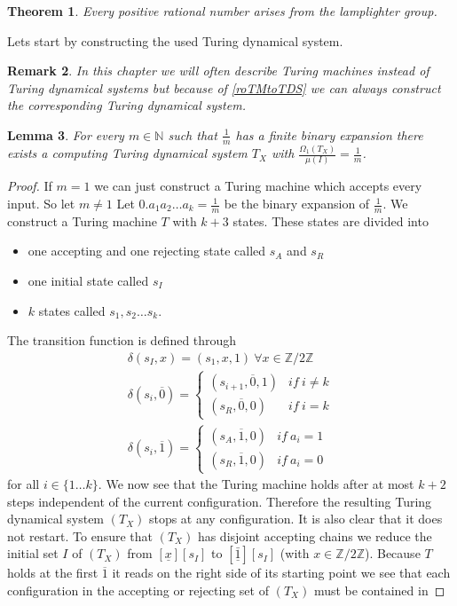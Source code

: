 \documentclass[12pt,a4paper]{scrartcl}
\newtheorem{Theorem}{Theorem}[section]
\newtheorem{Lemma}[Theorem]{Lemma}
\newtheorem{Remark}[Theorem]{Remark}
\numberwithin{equation}{section}
\newcommand{\N}{\mathbb{N}} %
\newcommand{\2}{\mathbb{Z} / 2 \mathbb{Z}}
\newcommand{\1}{\bar{1}}
\newcommand{\0}{\bar{0}}
\begin{document}
\begin{Theorem} \label{mainTh}
	Every positive rational number arises from the lamplighter group.
\end{Theorem}
Lets start by constructing the used Turing dynamical system. 
\begin{Remark}
	In this chapter we will often describe Turing machines instead of Turing dynamical systems but because of \ref{roTMtoTDS} we can always construct the corresponding Turing dynamical system.
\end{Remark}
\begin{Lemma} \label{1TM}
	For every $m \in \N$ such that $\frac{1}{m}$ has a finite binary expansion there exists a computing Turing dynamical system $T_X$ with $\frac{\Omega_1(T_X)}{\mu(I)} = \frac{1}{m}$.
\end{Lemma}
\begin{proof}
	If $m = 1$ we can just construct a Turing machine which accepts every input. So let $m \neq 1$
	Let $0. a_1 a_2 \ldots a_k = \frac{1}{m}$ be the binary expansion of $\frac{1}{m}$. We construct a Turing machine $T$ with $k+3$ states. These states are divided into
	\begin{itemize}
		\item one accepting and one rejecting state called $s_A$ and $s_R$
		\item one initial state called $s_I$
		\item $k$ states called $s_1, s_2 \ldots s_k$.
	\end{itemize}
	The transition function is defined through 
	\begin{align*}
		\delta(s_I, x) = (s_1, x, 1) \ \forall x \in \2 \\
		\delta(s_i, \overline{0}) = \begin{cases}
			(s_{i+1}, \overline{0}, 1) & if \ i \neq k \\
			(s_R, \overline{0}, 0) & if \ i = k
		\end{cases} \\
		\delta(s_i, \overline{1}) = \begin{cases}
			(s_A, \overline{1}, 0) & if \ a_i = 1 \\
			(s_R, \overline{1}, 0) & if \ a_i = 0
		\end{cases}
	\end{align*}
	for all $i \in \{1 \ldots k\}$.	We now see that the Turing machine holds after at most $k+2$ steps independent of the current configuration. Therefore the resulting Turing dynamical system $(T_X)$ stops at any configuration. It is also clear that it does not restart. To ensure that $(T_X)$ has disjoint accepting chains we reduce the initial set $I$ of $(T_X)$ from $[\underline{x}][s_I]$ to $[\underline{\1}][s_I]$ (with $x \in \2$). Because $T$ holds at the first $\overline{1}$ it reads on the right side of its starting point we see that each configuration in the accepting or rejecting set of $(T_X)$ must be contained in

\end{proof}
\end{document}
